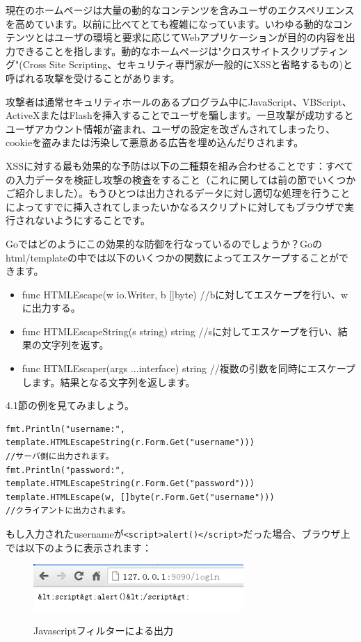 現在のホームページは大量の動的なコンテンツを含みユーザのエクスペリエンスを高めています。以前に比べてとても複雑になっています。いわゆる動的なコンテンツとはユーザの環境と要求に応じてWebアプリケーションが目的の内容を出力できることを指します。動的なホームページは"クロスサイトスクリプティング"(Cross Site Scripting、セキュリティ専門家が一般的にXSSと省略するもの)と呼ばれる攻撃を受けることがあります。

攻撃者は通常セキュリティホールのあるプログラム中にJavaScript、VBScript、ActiveXまたはFlashを挿入することでユーザを騙します。一旦攻撃が成功するとユーザアカウント情報が盗まれ、ユーザの設定を改ざんされてしまったり、cookieを盗みまたは汚染して悪意ある広告を埋め込んだりされます。

XSSに対する最も効果的な予防は以下の二種類を組み合わせることです：すべての入力データを検証し攻撃の検査をすること（これに関しては前の節でいくつかご紹介しました）。もうひとつは出力されるデータに対し適切な処理を行うことによってすでに挿入されてしまったいかなるスクリプトに対してもブラウザで実行されないようにすることです。

Goではどのようにこの効果的な防御を行なっているのでしょうか？Goのhtml/templateの中では以下のいくつかの関数によってエスケープすることができます。


\begin{itemize}
  \item func HTMLEscape(w io.Writer, b []byte) //bに対してエスケープを行い、wに出力する。
  \item func HTMLEscapeString(s string) string //sに対してエスケープを行い、結果の文字列を返す。
  \item func HTMLEscaper(args ...interface{}) string //複数の引数を同時にエスケープします。結果となる文字列を返します。
\end{itemize}

4.1節の例を見てみましょう。

\begin{lstlisting}[numbers=none]
fmt.Println("username:", template.HTMLEscapeString(r.Form.Get("username")))
//サーバ側に出力されます。
fmt.Println("password:", template.HTMLEscapeString(r.Form.Get("password")))
template.HTMLEscape(w, []byte(r.Form.Get("username")))
//クライアントに出力されます。
\end{lstlisting}

もし入力されたusernameが\texttt{<script>alert()</script>}だった場合、ブラウザ上では以下のように表示されます：

\begin{figure}[H]
  \includegraphics[width=8cm]{4.3.escape.png}
   \label{図4.3}
   \caption{Javascriptフィルターによる出力}
\end{figure}

